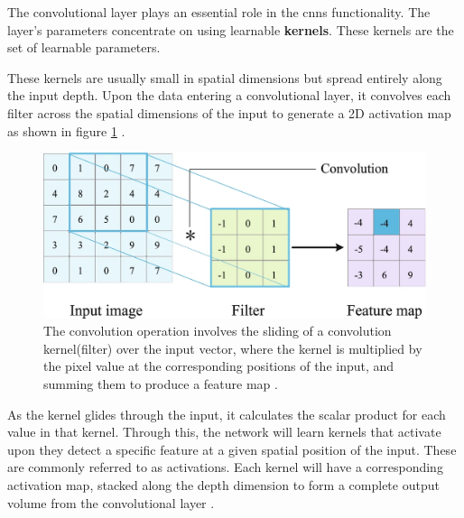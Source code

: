 The convolutional layer plays an essential role in the \glspl{cnn} functionality. The layer's parameters concentrate on using learnable \textbf{kernels}. These kernels are the set of learnable parameters.

These kernels are usually small in spatial dimensions but spread entirely along the input depth. Upon the data entering a convolutional layer, it convolves each filter across the spatial dimensions of the input to generate a 2D activation map as shown in figure \ref{fig:convolutional layer} \cite{oshea2015introductionconvolutionalneuralnetworks}.


\begin{figure}[ht!]
    \centering
    \includegraphics[width=1\linewidth]{Rohit_Master_Thesis//Images/conv_layer_v2.png}
    \caption{The convolution operation involves the sliding of a convolution kernel(filter) over the input vector, where the kernel is multiplied by the pixel value at the corresponding positions of the input, and summing them to produce a feature map \cite{Zhao2024}.}
    \label{fig:convolutional layer}
\end{figure}

As the kernel glides through the input, it calculates the scalar product for each value in that kernel. Through this, the network will learn kernels that activate upon they detect a specific feature at a given spatial position of the input. These are commonly referred to as activations. Each kernel will have a corresponding activation map, stacked along the depth dimension to form a complete output volume from the convolutional layer \cite{oshea2015introductionconvolutionalneuralnetworks}.

